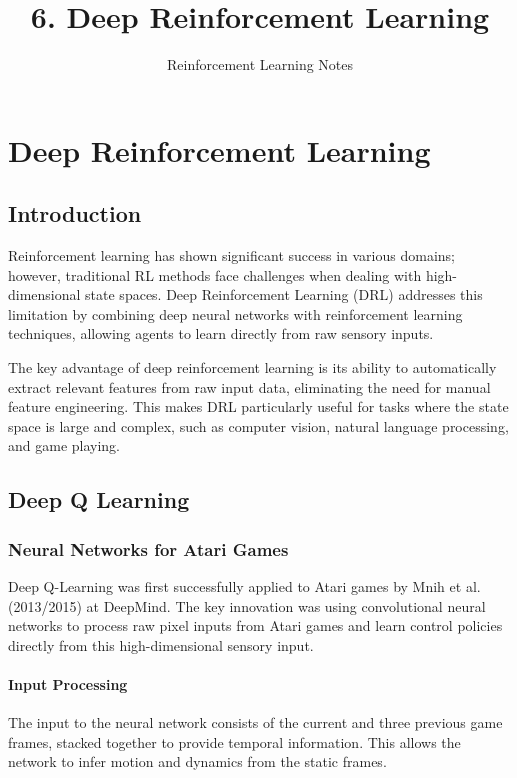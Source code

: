 \documentclass[11pt]{article}
\title{6. Deep Reinforcement Learning}
\author{Reinforcement Learning Notes}
\date{}
\begin{document}
\maketitle

\tableofcontents
\newpage

\section{Deep Reinforcement Learning}

\subsection{Introduction}

Reinforcement learning has shown significant success in various domains; however, traditional RL methods face challenges when dealing with high-dimensional state spaces. Deep Reinforcement Learning (DRL) addresses this limitation by combining deep neural networks with reinforcement learning techniques, allowing agents to learn directly from raw sensory inputs.

The key advantage of deep reinforcement learning is its ability to automatically extract relevant features from raw input data, eliminating the need for manual feature engineering. This makes DRL particularly useful for tasks where the state space is large and complex, such as computer vision, natural language processing, and game playing.

\subsection{Deep Q Learning}

\subsubsection{Neural Networks for Atari Games}

Deep Q-Learning was first successfully applied to Atari games by Mnih et al. (2013/2015) at DeepMind. The key innovation was using convolutional neural networks to process raw pixel inputs from Atari games and learn control policies directly from this high-dimensional sensory input.

\paragraph{Input Processing}
The input to the neural network consists of the current and three previous game frames, stacked together to provide temporal information. This allows the network to infer motion and dynamics from the static frames.
\end{document}
